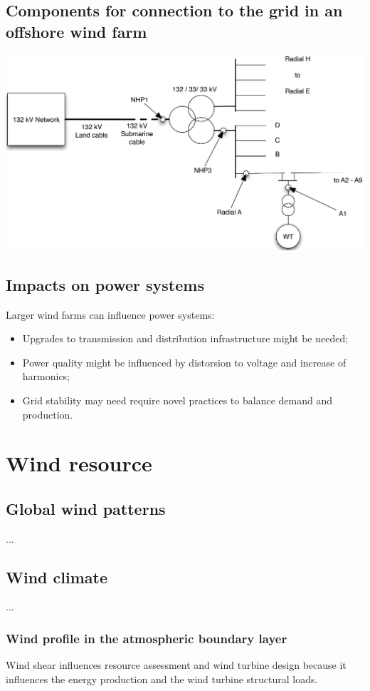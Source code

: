 \documentclass{article}
\begin{document}
\subsection{Components for connection to the grid in an offshore wind farm}
\begin{center}
    \includegraphics[width=.8\textwidth]{media/farm_components.png}
\end{center}

\subsection{Impacts on power systems}
Larger wind farms can influence power systems:
\begin{itemize}
    \item Upgrades to transmission and distribution infrastructure might be needed;
    \item Power quality might be influenced by distorsion to voltage and increase of harmonics;
    \item Grid stability may need require novel practices to balance demand and production.
\end{itemize}



\newpage
\section{Wind resource}
\subsection{Global wind patterns}
...

\subsection{Wind climate}
...

\subsubsection{Wind profile in the atmospheric boundary layer}
Wind shear influences resource assessment and wind turbine design because
it influences the energy production and the wind turbine structural loads.
\end{document}
